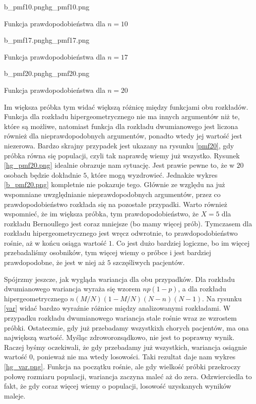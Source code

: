 \begin{diagrams}{b_pmf10.png}{hg_pmf10.png}
	\caption{Funkcja prawdopodobieństwa dla $n=10$}
	\label{pmf10}
\end{diagrams}

\begin{diagrams}{b_pmf17.png}{hg_pmf17.png}
	\caption{Funkcja prawdopodobieństwa dla $n=17$}
	\label{pmf17}
\end{diagrams}

\begin{diagrams}{b_pmf20.png}{hg_pmf20.png}
	\caption{Funkcja prawdopodobieństwa dla $n=20$}
	\label{pmf20}
\end{diagrams}

Im większa próbka tym widać większą różnicę między funkcjami obu rozkładów. Funkcja dla rozkładu hipergeometrycznego nie ma innych argumentów niż te, które są możliwe, natomiast funkcja dla rozkładu dwumianowego jest liczona również dla nieprawdopodobnych argumentów, ponadto wtedy jej wartość jest niezerowa. Bardzo skrajny przypadek jest ukazany na rysunku \ref{pmf20}, gdy próbka równa się populacji, czyli tak naprawdę wiemy już wszystko. Rysunek \ref{hg_pmf20.png} idealnie obrazuje nam sytuację. Jest prawie pewne to, że w $20$ osobach będzie dokładnie $5$, które mogą wyzdrowieć. Jednakże wykres \ref{b_pmf20.png} kompletnie nie pokazuje tego. Głównie ze względu na już wspomniane uwzględnianie nieprawdopodobnych argumentów, przez co prawdopodobieństwo rozkłada się na pozostałe przypadki. Warto również wspomnieć, że im większa próbka, tym prawdopodobieństwo, że $X=5$ dla rozkładu Bernoullego jest coraz mniejsze (bo mamy więcej prób). Tymczasem dla rozkładu hipergeometrycznego jest wręcz odwrotnie, to prawdopodobieństwo rośnie, aż w końcu osiąga wartość $1$. Co jest dużo bardziej logiczne, bo im więcej przebadaliśmy osobników, tym więcej wiemy o próbce i jest bardziej prawdopodobne, że jest w niej aż $5$ szczęśliwych pacjentów.

Spójrzmy jeszcze, jak wygląda wariancja dla obu przypadków. Dla rozkładu dwumianowego wariancja wyraża się wzorem $np(1-p)$, a dla rozkładu hipergeometrycznego $n(M/N)(1-M/N)(N-n)(N-1)$. Na rysunku \ref{var} widać bardzo wyraźnie różnice między analizowanymi rozkładami. W przypadku rozkładu dwumianowego wariancja stale rośnie wraz ze wzrostem próbki. Ostatecznie, gdy już przebadamy wszystkixh chorych pacjentów, ma ona największą wartość. Myśląc zdroworozsądkowo, nie jest to poprawny wynik. Raczej byśmy oczekiwali, że gdy przebadamy już wszystkich, wariancja osiągnie wartość $0$, ponieważ nie ma wtedy losowości. Taki rezultat daje nam wykres \ref{hg_var.png}. Funkcja na początku rośnie, ale gdy wielkość próbki przekroczy połowę rozmiaru populacji, wariancja zaczyna maleć aż do zera. Odzwierciedla to fakt, że gdy coraz więcej wiemy o populacji, losowość uzyskanych wyników maleje.

